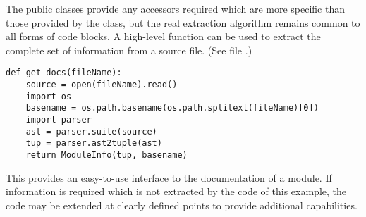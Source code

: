 The public classes provide any accessors required which are more
specific than those provided by the  class, but
the real extraction algorithm remains common to all forms of code
blocks.  A high-level function can be used to extract the complete set
of information from a source file.  (See file .)

\begin{verbatim}
def get_docs(fileName):
    source = open(fileName).read()
    import os
    basename = os.path.basename(os.path.splitext(fileName)[0])
    import parser
    ast = parser.suite(source)
    tup = parser.ast2tuple(ast)
    return ModuleInfo(tup, basename)
\end{verbatim}

This provides an easy-to-use interface to the documentation of a
module.  If information is required which is not extracted by the code
of this example, the code may be extended at clearly defined points to
provide additional capabilities.

\begin{seealso}



\end{seealso}
